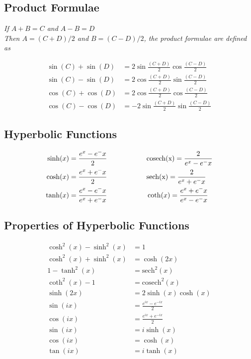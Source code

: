 \subsection{Product Formulae}
\textit{If $A+B = C$ and $A-B = D$}\\
\textit{Then $A = (C+D)/2$ and $B = (C-D)/2$, the product formulae are defined as}

\begin{align*}
\sin(C) + \sin(D) &= 2\sin\frac{(C+D)}{2}\cos\frac{(C-D)}{2}\\
\sin(C) - \sin(D) &= 2\cos\frac{(C+D)}{2}\sin\frac{(C-D)}{2}\\
\cos(C) + \cos(D) &= 2\cos\frac{(C+D)}{2}\cos\frac{(C-D)}{2}\\
\cos(C) - \cos(D) &= -2\sin\frac{(C+D)}{2}\sin\frac{(C-D)}{2}
\end{align*}

\subsection{Hyperbolic Functions}
\begin{align*}
\sinh(x) &= \frac{e^x - e^-x}{2} \hspace{20mm} \mathrm{cosech(x)} = \frac{2}{e^x - e^-x}\\
\cosh(x) &= \frac{e^x + e^-x}{2} \hspace{20mm} \mathrm{sech(x)} = \frac{2}{e^x + e^-x}\\
\tanh(x) &= \frac{e^x - e^-x}{e^x + e^-x} \hspace{20mm} \coth(x) = \frac{e^x + e^-x}{e^x - e^-x}
\end{align*}

\subsection{Properties of Hyperbolic Functions}
\begin{align*}
\cosh^2(x) - \sinh^2(x) &= 1\\
\cosh^2(x) + \sinh^2(x) &= \cosh(2x)\\
1 - \tanh^2(x) &= \mathrm{sech}^2(x)\\
\coth^2(x) - 1 &= \mathrm{cosech}^2(x)\\
\sinh(2x) &= 2\sinh(x)\cosh(x)\\
\sin(ix) &= \frac{e^{ix} - e^{-ix}}{2}\\
\cos(ix) &= \frac{e^{ix} + e^{-ix}}{2}\\
\sin(ix) &= i\sinh(x)\\
\cos(ix) &= \cosh(x)\\
\tan(ix) &= i\tanh(x)
\end{align*}


